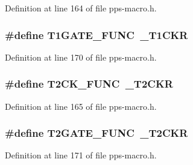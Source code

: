Definition at line 164 of file pps-\/macro.\+h.

\hypertarget{pps-macro_8h_a37673ad7538f53d925e8ef0c1524aca2}{}
\subsubsection[{T1\+G\+A\+T\+E\+\_\+\+F\+U\+N\+C}]{\setlength{\rightskip}{0pt plus 5cm}\#define T1\+G\+A\+T\+E\+\_\+\+F\+U\+N\+C~\+\_\+\+T1\+C\+K\+R}\label{pps-macro_8h_a37673ad7538f53d925e8ef0c1524aca2}


Definition at line 170 of file pps-\/macro.\+h.

\hypertarget{pps-macro_8h_ae1786e0ed93bd9555db43c0729dcaf6f}{}
\subsubsection[{T2\+C\+K\+\_\+\+F\+U\+N\+C}]{\setlength{\rightskip}{0pt plus 5cm}\#define T2\+C\+K\+\_\+\+F\+U\+N\+C~\+\_\+\+T2\+C\+K\+R}\label{pps-macro_8h_ae1786e0ed93bd9555db43c0729dcaf6f}


Definition at line 165 of file pps-\/macro.\+h.

\hypertarget{pps-macro_8h_a83ff1bfe6b9874e8acb6e9e19b21a2ac}{}
\subsubsection[{T2\+G\+A\+T\+E\+\_\+\+F\+U\+N\+C}]{\setlength{\rightskip}{0pt plus 5cm}\#define T2\+G\+A\+T\+E\+\_\+\+F\+U\+N\+C~\+\_\+\+T2\+C\+K\+R}\label{pps-macro_8h_a83ff1bfe6b9874e8acb6e9e19b21a2ac}


Definition at line 171 of file pps-\/macro.\+h.

\hypertarget{pps-macro_8h_a14b73712963fec1b549b2bb2a7346f88}{}
